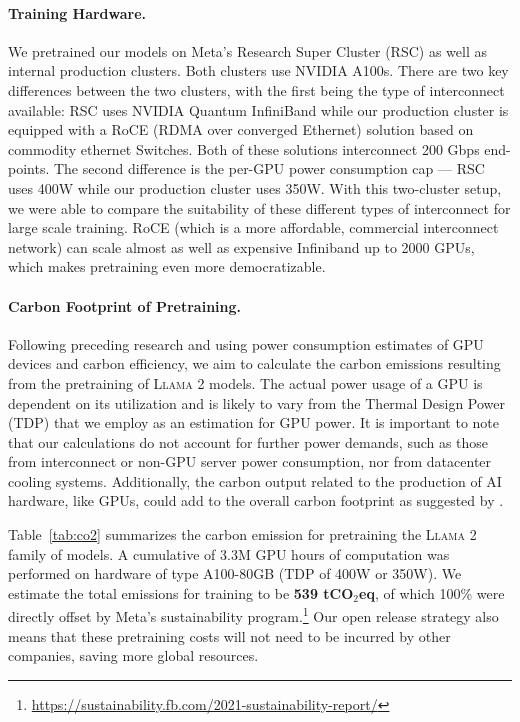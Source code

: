 \paragraph{Training Hardware.} We pretrained our models on Meta's Research Super Cluster (RSC) \citep{lee2022rsc} as well as internal production clusters. Both clusters use NVIDIA A100s.  There are two key differences between the two clusters, with the first being the type of interconnect available: RSC uses NVIDIA Quantum InfiniBand while our production cluster is equipped with a RoCE (RDMA over converged Ethernet) solution based on commodity ethernet Switches. Both of these solutions interconnect 200 Gbps end-points. The second difference is the per-GPU power consumption cap --- RSC uses 400W while our production cluster uses 350W.  With this two-cluster setup, we were able to compare the suitability of these different types of interconnect for large scale training.  RoCE (which is a more affordable, commercial interconnect network) can scale almost as well as expensive Infiniband up to 2000 GPUs, which makes pretraining even more democratizable. 

\paragraph{Carbon Footprint of Pretraining.} 
\label{sec:carbon}
Following preceding research \citep{bender-et-al-2021,patterson2021carbon,wu2022sustainable,dodge2022measuring} and using power consumption estimates of GPU devices and carbon efficiency, we aim to calculate the carbon emissions resulting from the pretraining of \textsc{Llama 2} models. The actual power usage of a GPU is dependent on its utilization and is likely to vary from the Thermal Design Power (TDP) that we employ as an estimation for GPU power. It is important to note that our calculations do not account for further power demands, such as those from interconnect or non-GPU server power consumption, nor from datacenter cooling systems. Additionally, the carbon output related to the production of AI hardware, like GPUs, could add to the overall carbon footprint as suggested by \cite{gupta2022chasing,gupta2022act}.

Table~\ref{tab:co2} summarizes the carbon emission for pretraining the \textsc{Llama 2} family of models. A cumulative of 3.3M GPU hours of computation was performed on hardware of type A100-80GB (TDP of 400W or 350W). We estimate the total emissions for training to be \textbf{539 tCO$_2$eq}, of which 100\% were directly offset by Meta's sustainability program.\footnote{\url{https://sustainability.fb.com/2021-sustainability-report/}} Our open release strategy also means that these pretraining costs will not need to be incurred by other companies, saving more global resources.

